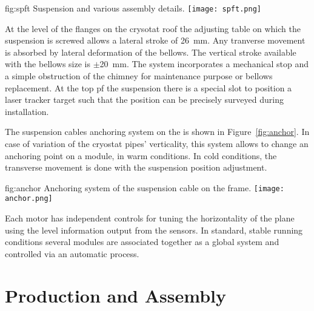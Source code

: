 \begin{dunefigure}{fig:spft}
{Suspension \fdth and various assembly details.}
\texttt{[image: spft.png]}
\end{dunefigure}

At the level of the flanges on the crysotat roof the adjusting table on which the suspension \fdth is screwed allows a lateral stroke of \SI{26}{mm}. Any tranverse movement is absorbed by lateral deformation of the bellows.
The vertical stroke available with the bellows size is $\pm$\SI{20}{mm}.
The system incorporates a  mechanical stop and a simple obstruction of the chimney for maintenance purpose or bellows replacement.
At the top pf the suspension \fdth there is a special slot to position a laser tracker target
such that the \fdth position can be precisely surveyed during installation.

The suspension cables anchoring system on the  is shown in Figure~\ref{fig:anchor}. 
In case of variation of the cryostat pipes' verticality, this system allows to change an anchoring point on a module, in warm conditions. In cold conditions, the transverse movement is done with the suspension \fdth position adjustment.
\begin{dunefigure}{fig:anchor}
{Anchoring system of the suspension cable on the  frame.}
\texttt{[image: anchor.png]}
\end{dunefigure}

Each motor has independent controls for tuning the horizontality of the plane using the  level information output from the %
sensors. In standard, stable running  conditions several  modules are associated together as a global system and controlled via an automatic process.



\section{Production and Assembly}
\label{sec:fddp-crp-prod-assy}

